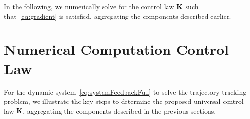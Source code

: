 \documentclass[
12pt,draftcls,onecolumn%
]{IEEEtran}
\begin{document}
%
In the following, we numerically solve for the control law ${\bf K}$ such that~\eqref{eq:gradient} is satisfied, aggregating the components described earlier.


\section{Numerical Computation Control Law}
\label{sec:control-optimization}
For the dynamic system~\eqref{eq:systemFeedbackFull} to solve the trajectory tracking problem, we illustrate the key steps to determine the proposed universal control law ${\bf K}$, aggregating the components described in the previous sections. 
\end{document}

